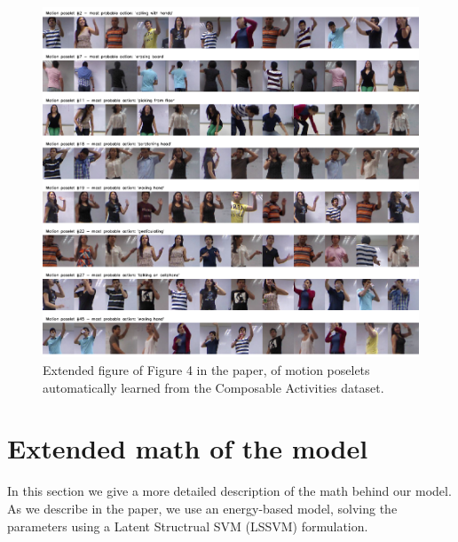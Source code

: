 \documentclass[10pt,letterpaper]{article}
\newcommand{\+}[1]{\ensuremath{{\boldsymbol #1}}}
\begin{document}
\begin{figure}[tb]
\begin{center}
\includegraphics[width=0.999\linewidth]{../Fig/fig_poses_complete.pdf}
\end{center}
\caption{Extended figure of Figure 4 in the paper, of motion poselets automatically learned from the Composable Activities dataset.  }
\label{fig_poses}
\end{figure}


\section{Extended math of the model}

In this section we give a more detailed description of the math behind our model. As we describe in the paper, we use an energy-based model, solving the parameters using a Latent Structrual SVM (LSSVM) formulation.
\end{document}
